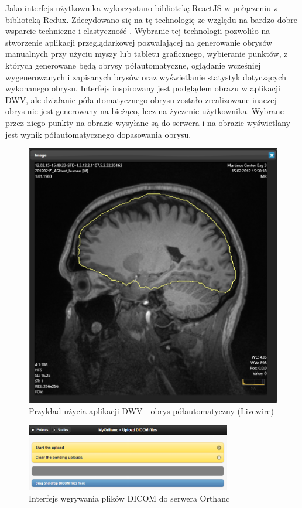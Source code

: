 \documentclass[a4paper,11pt,twoside,openright]{report}
\theoremstyle{definition}
\begin{document}
Jako interfejs użytkownika wykorzystano bibliotekę ReactJS \cite{React} w połączeniu
z biblioteką Redux\cite{Redux}. Zdecydowano się na tę technologię ze względu na bardzo dobre wsparcie techniczne
i elastyczność \cite{Dlaczego react}. Wybranie tej technologii pozwoliło na stworzenie
aplikacji przeglądarkowej pozwalającej na generowanie obrysów manualnych przy
użyciu myszy lub tabletu graficznego, wybieranie punktów, z których generowane
będą obrysy półautomatyczne, oglądanie wcześniej wygenerowanych i zapisanych
brysów oraz wyświetlanie statystyk dotyczących wykonanego obrysu. Interfejs
inspirowany jest podglądem obrazu w aplikacji DWV, ale działanie półautomatycznego
obrysu zostało zrealizowane inaczej --- obrys nie jest generowany na bieżąco, lecz na życzenie
użytkownika. Wybrane przez niego punkty na obrazie wysyłane są do serwera i na obrazie wyświetlany jest
wynik półautomatycznego dopasowania obrysu.

\begin{figure}[t]
	\includegraphics[width=1\textwidth]{DWV-interface}
	\caption{Przykład użycia aplikacji DWV - obrys półautomatyczny (Livewire)}
    	\label{fig:DWV-interface}
\end{figure}

\begin{figure}[b]
	\center
	\includegraphics[width=0.8\textwidth]{Orthanc-upload}
	\caption{Interfejs wgrywania plików DICOM do serwera Orthanc}
    	\label{fig:Orthanc-upload}
\end{figure}
\end{document}
